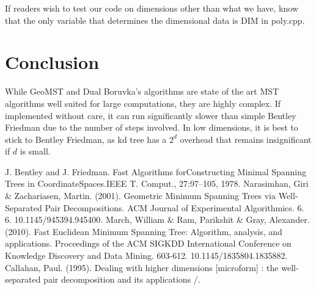 \documentclass[11pt]{article}
\begin{document}
If readers wish to test our code on dimensions other than what we have, know that the only variable that determines the dimensional data is DIM in poly.cpp. 

\section{Conclusion}

While GeoMST and Dual Boruvka's algorithms are state of the art MST algorithms well suited for large computations, they are highly complex. If implemented without care, it can run significantly slower than simple Bentley Friedman due to the number of steps involved. In low dimensions, it is best to stick to Bentley Friedman, as kd tree has a $2^d$ overhead that remains insignificant if $d$ is small.    


\begin{thebibliography}{9}
	 J. Bentley and J. Friedman. Fast Algorithms forConstructing Minimal Spanning Trees in CoordinateSpaces.IEEE T. Comput., 27:97–105, 1978.
	 Narasimhan, Giri \& Zachariasen, Martin. (2001). Geometric Minimum Spanning Trees via Well-Separated Pair Decompositions. ACM Journal of Experimental Algorithmics. 6. 6. 10.1145/945394.945400. 
	 March, William \& Ram, Parikshit \& Gray, Alexander. (2010). Fast Euclidean Minimum Spanning Tree: Algorithm, analysis, and applications. Proceedings of the ACM SIGKDD International Conference on Knowledge Discovery and Data Mining. 603-612. 10.1145/1835804.1835882. 
	 Callahan, Paul. (1995). Dealing with higher dimensions [microform] : the well-separated pair decomposition and its applications /. 

\end{thebibliography}
\end{document}
